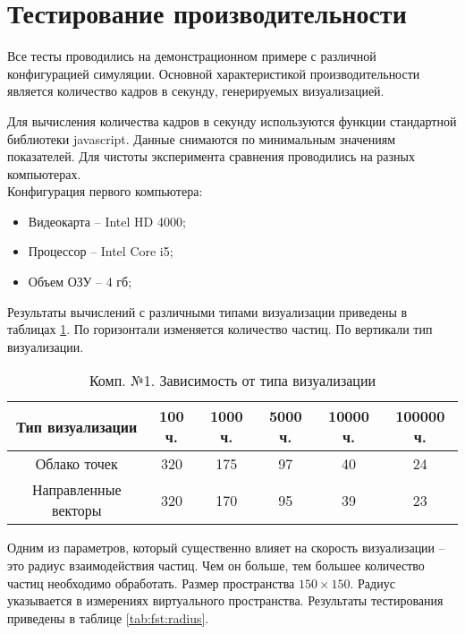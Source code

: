 \newpage
\section{Тестирование производительности}

Все тесты проводились на демонстрационном примере с различной конфигурацией
симуляции. Основной характеристикой производительности является количество 
кадров в секунду, генерируемых визуализацией.

Для вычисления количества кадров в секунду используются функции стандартной 
библиотеки javascript. Данные снимаются по минимальным значениям показателей.
Для чистоты эксперимента сравнения проводились на разных компьютерах. \\

Конфигурация первого компьютера:

\begin{itemize}
  \item Видеокарта -- Intel HD 4000;
  \item Процессор -- Intel Core i5;
  \item Объем ОЗУ -- 4 гб;
\end{itemize}

Результаты вычислений с различными типами визуализации приведены 
в таблицах \ref{tab:fst:simple}. По горизонтали изменяется количество частиц.
По вертикали тип визуализации.

\begin{table}[H]
  \caption{\label{tab:fst:simple}Комп. №1. Зависимость от типа визуализации}
  \begin{center}
    \begin{tabular}{|c|c|c|c|c|c|}
      \hline
      Тип визуализации & 100 ч. & 1000 ч. & 5000 ч. & 10000 ч. & 100000 ч. \\
      \hline
      Облако точек & 320 & 175 & 97 & 40 & 24 \\
      Направленные векторы & 320 & 170 & 95 & 39 & 23 \\
      \hline
    \end{tabular}
  \end{center}
\end{table}

Одним из параметров, который существенно влияет на скорость визуализации -- это
радиус взаимодействия частиц. Чем он больше, тем большее количество частиц необходимо
обработать. Размер пространства $150\times150$. Радиус указывается в измерениях
виртуального пространства. Результаты тестирования приведены в таблице \ref{tab:fst:radius}.

